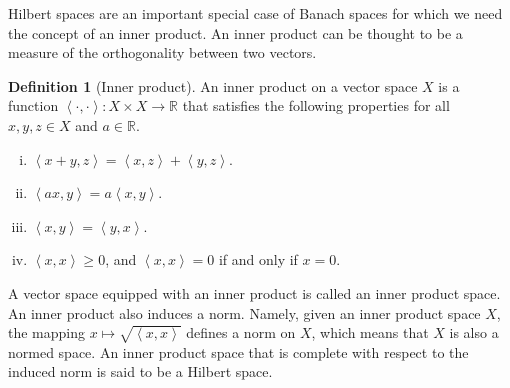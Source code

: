 \documentclass[english, 12pt, a4paper, sci, utf8, a-2b, online]{aaltothesis}
\theoremstyle{definition}
\newtheorem{definition}{Definition}[section]
\theoremstyle{plain}
\newcommand*{\innerprod}[2]{\left\langle #1, #2 \right\rangle}
\numberwithin{equation}{section}
\begin{document}
Hilbert spaces are an important special case of Banach spaces
for which we need the concept of an inner product.
An inner product can be thought to be a measure of the orthogonality
between two vectors.
\begin{definition}[Inner product]
    \label{def:innerproduct}
    An inner product on a vector space $X$ is a function
    $\innerprod{\cdot}{\cdot}: X \times X \to \mathbb{R}$
    that satisfies the following properties for all $x,y,z \in X$
    and $a \in \mathbb{R}$.
    \begin{enumerate}[(i)]
        \item $\innerprod{x+y}{z}=\innerprod{x}{z} + \innerprod{y}{z}$.
        \item $\innerprod{ax}{y} = a\innerprod{x}{y}$.
        \item $\innerprod{x}{y} = \innerprod{y}{x}$.
        \item $\innerprod{x}{x} \geq 0$, and $\innerprod{x}{x}=0$
        if and only if $x=0$.
    \end{enumerate}
\end{definition}
A vector space equipped with an inner product is called an inner product space.
An inner product also induces a norm. Namely, given an inner product space $X$,
the mapping $x \mapsto \sqrt{\innerprod{x}{x}}$ defines a norm on $X$,
which means that $X$ is also a normed space.
An inner product space that is complete with respect to the induced norm
is said to be a Hilbert space.
\end{document}
